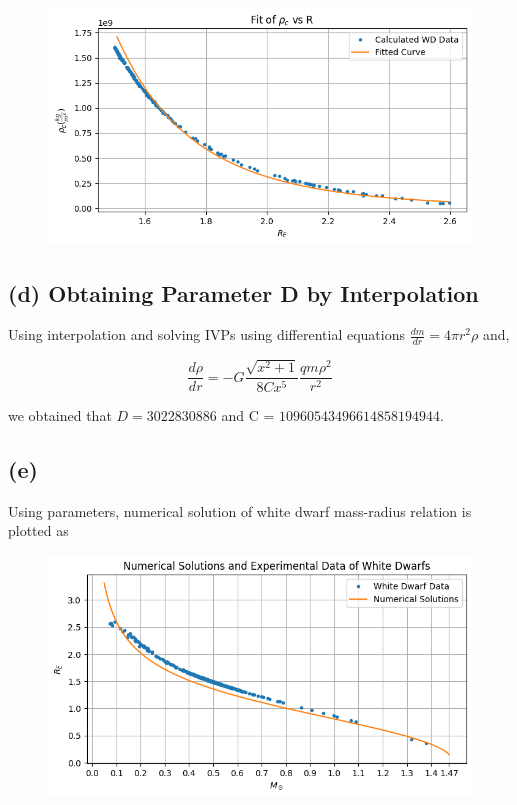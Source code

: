 \documentclass[aps,twocolumn,showpacs,preprintnumbers,nofootinbib,prl,superscriptaddress,groupedaddress]{revtex4-2}
\begin{document}
\begin{figure}[!htb]
	\centering
	\includegraphics[width=0.5\linewidth]{Plots/newton-part-c4}
	\caption{}
	\label{fig:newton-part-c4}
\end{figure}


\subsection{(d) Obtaining Parameter D by Interpolation}

Using interpolation and solving IVPs using differential equations $\frac{dm}{dr} = 4\pi r^2 \rho$ and,

\begin{equation}
	\frac{d\rho}{dr} = -G \frac{\sqrt{x^2+1}}{8Cx^5}\frac{qm\rho^2}{r^2}
\end{equation}

we obtained that $D = 3022830886$ and C = $10960543496614858194944$.

\subsection{(e)}

Using parameters, numerical solution of white dwarf mass-radius relation is plotted as

\begin{figure}[!htb]
	\centering
	\includegraphics[width=0.5\linewidth]{Plots/newton-part-e}
	\caption{}
	\label{fig:newton-part-e}
\end{figure}
\end{document}
